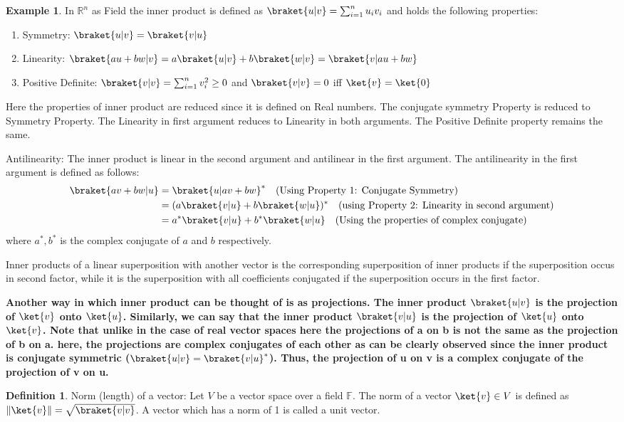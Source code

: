 \documentclass[12pt, oneside]{book}
\theoremstyle{definition}
\newtheorem{definition}{Definition}[section]
\theoremstyle{definition}
\newtheorem{example}{Example}[section]
\theoremstyle{remark}
\begin{document}
\begin{example}
    In $\mathbb{R}^n$ as Field the inner product is defined as $\braket{u|v}=\sum_{i=1}^{n}u_iv_i$
    and holds the following properties:
    \begin{enumerate}
        \item Symmetry: $\braket{u|v}=\braket{v|u}$
        \item Linearity: $\braket{au+bw|v}=a\braket{u|v}+b\braket{w|v}=\braket{v|au+bw}$
        \item Positive Definite: $\braket{v|v}=\sum_{i=1}^{n}v_i^2\geq 0$ and $\braket{v|v}=0$ iff $\ket{v}=\ket{0}$
    \end{enumerate}
    Here the properties of inner product are reduced since it is defined on Real numbers. The conjugate symmetry Property
    is reduced to Symmetry Property. The Linearity in first argument reduces to Linearity in both arguments. 
    The Positive Definite property remains the same.
\end{example}

Antilinearity: The inner product is linear in the second argument and antilinear in the first argument. The antilinearity in the first argument is defined as follows:
\begin{align*}
    \braket{av+bw|u}&=\braket{u|av+bw}^* \quad \text{(Using Property 1: Conjugate Symmetry)} \\
    &=(a\braket{v|u} + b\braket{w|u} )^* \quad \text{(using Property 2: Linearity in second argument)}\\
    &=a^*\braket{v|u}+b^*\braket{w|u} \quad \text{(Using the properties of complex conjugate)}\\
\end{align*}
where $a^*,b^*$ is the complex conjugate of $a$ and $b$ respectively. 

Inner products of a linear superposition with another vector is the corresponding superposition of inner products if the superposition
occus in second factor, while it is the superposition with all coefficients conjugated if the superposition occurs in the first factor.

\textbf{Another way in which inner product can be thought of is as projections. The inner product $\braket{u|v}$ is the projection 
of $\ket{v}$ onto $\ket{u}$. Similarly, we can say that the inner product $\braket{v|u}$ is the projection of $\ket{u}$ onto $\ket{v}$. Note that unlike in 
the case of real vector spaces here the projections of a on b is not the same as the projection of b on a. here, the projections are complex conjugates of each other as 
can be clearly observed since the inner product is conjugate symmetric ($\braket{u|v}=\braket{v|u}^*$). Thus, the projection of u on v is a complex conjugate of 
the projection of v on u.}
\begin{definition}
    Norm (length) of a vector: Let $V$ be a vector space over a field $\mathbb{F}$. The norm of a vector $\ket{v}\in V$ is defined as $\|\ket{v}\|=\sqrt{\braket{v|v}}$.
    A vector which has a norm of 1 is called a unit vector.
\end{definition}
\end{document}
